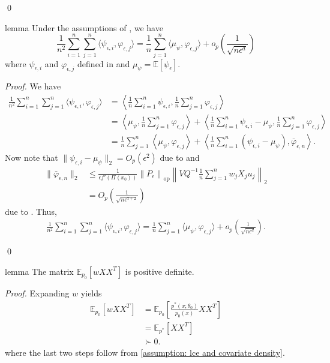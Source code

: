 \documentclass[11pt]{article}
\begin{document}
\qed{}


\begin{restatable}{lemma}{} \label{lemma: inner prod decomp}
    Under the assumptions of , we have 
    \[\frac{1}{n^2} \sum_{i = 1}^n\sum_{j = 1}^n\langle\psi_{ \epsilon, i}, \varphi_{\epsilon, j}\rangle = \frac{1}{n}\sum_{j = 1}^n\langle\mu_{\psi}, \varphi_{\epsilon, j}\rangle + o_p\left(\frac{1}{\sqrt{n\epsilon^d}}\right)\]
    where $\psi_{\epsilon, i}$ and $\varphi_{\epsilon, j}$ defined in  and $\mu_{\psi} = \mathbb{E}[\psi_{\epsilon}]$. 
\end{restatable}
\noindent \textit{Proof.} We have
\begin{align*}
    \frac{1}{n^2} \sum_{i = 1}^n\sum_{j = 1}^n\langle\psi_{ \epsilon, i}, \varphi_{\epsilon, j}\rangle &= \left\langle\frac{1}{n}\sum_{i = 1}^n\psi_{\epsilon, i}, \frac{1}{n}\sum_{j = 1}^n\varphi_{\epsilon, j} \right\rangle \\
    &= \left\langle\mu_\psi, \frac{1}{n}\sum_{j = 1}^n\varphi_{\epsilon, j} \right\rangle + \left\langle\frac{1}{n}\sum_{i = 1}^n\psi_{\epsilon, i} - \mu_{\psi}, \frac{1}{n}\sum_{j = 1}^n\varphi_{\epsilon, j} \right\rangle \\
    &= \frac{1}{n}\sum_{j = 1}^n\left\langle\mu_\psi, \varphi_{\epsilon, j} \right\rangle + \left\langle \frac{1}{n}\sum_{i = 1}^n(\psi_{\epsilon, i} - \mu_{\psi}), \bar{\varphi}_{\epsilon, n} \right\rangle.
\end{align*}
Now note that $\|\psi_{\epsilon, i} - \mu_{\psi}\|_2 = O_p(\epsilon^2)$ due to  and 
\begin{align*}\|\bar\varphi_{\epsilon, n}\|_2 &\leq \frac{1}{\epsilon f'(\Pi(x_0))}\left\|P_{\epsilon}\right\|_{\text{op}}\left\|VQ^{-1}\frac{1}{n} \sum_{j = 1}^n w_jX_ju_j\right\|_2 \\
&= O_p\left(\frac{1}{\sqrt{n\epsilon^{d+2}}}\right)
\end{align*}
due to . Thus,
\begin{align*}
    \frac{1}{n^2} \sum_{i = 1}^n\sum_{j = 1}^n\langle\psi_{ \epsilon, i}, \varphi_{\epsilon, j}\rangle = \frac{1}{n}\sum_{j = 1}^n\langle\mu_{\psi}, \varphi_{\epsilon, j}\rangle + o_p\left(\frac{1}{\sqrt{n\epsilon^d}}\right).
\end{align*}

\qed{}




\begin{restatable}{lemma}{} \label{lemma: pd}
    The matrix $\mathbb{E}_{p_0}[wXX^T]$ is positive definite.
\end{restatable}
\noindent \textit{Proof.} Expanding $w$ yields
\begin{align}
    \mathbb{E}_{p_0}[wXX^T] &= \mathbb{E}_{p_0}\left[\frac{p^*(x;\theta_0)}{p_0(x)}XX^T\right] \\
    &= \mathbb{E}_{p^*}\left[XX^T\right] \\
    &\succ 0.
\end{align}
where the last two steps follow from \cref{assumption: lce and covariate density}.
\end{document}
